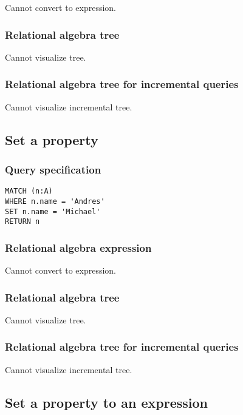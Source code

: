 Cannot convert to expression.

\subsubsection*{Relational algebra tree}

Cannot visualize tree.

\subsubsection*{Relational algebra tree for incremental queries}

Cannot visualize incremental tree.

\subsection{Set a property}

\subsubsection*{Query specification}

\begin{lstlisting}
MATCH (n:A)
WHERE n.name = 'Andres'
SET n.name = 'Michael'
RETURN n
\end{lstlisting}

\subsubsection*{Relational algebra expression}

Cannot convert to expression.

\subsubsection*{Relational algebra tree}

Cannot visualize tree.

\subsubsection*{Relational algebra tree for incremental queries}

Cannot visualize incremental tree.

\subsection{Set a property to an expression}

